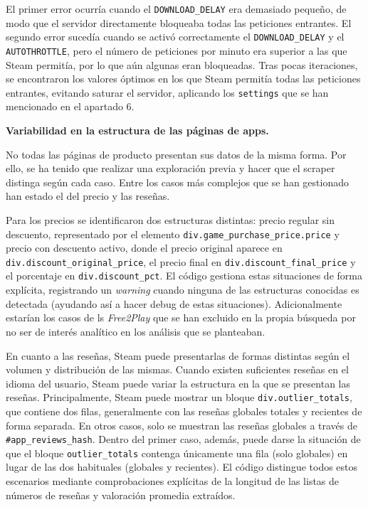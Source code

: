 \documentclass[
]{article}
\begin{document}
El primer error ocurría cuando el \texttt{DOWNLOAD\_DELAY} era demasiado pequeño, de modo que el servidor directamente bloqueaba todas las peticiones entrantes. El segundo error sucedía cuando se activó correctamente el \texttt{DOWNLOAD\_DELAY} y el \texttt{AUTOTHROTTLE}, pero el número de peticiones por minuto era superior a las que Steam permitía, por lo que aún algunas eran bloqueadas. Tras pocas iteraciones, se encontraron los valores óptimos en los que Steam permitía todas las peticiones entrantes, evitando saturar el servidor, aplicando los \texttt{settings} que se han mencionado en el apartado 6.

\vspace{0.2cm}
\textbf{Variabilidad en la estructura de las páginas de apps.}

No todas las páginas de producto presentan sus datos de la misma forma. Por ello, se ha tenido que realizar una exploración previa y hacer que el scraper distinga según cada caso. Entre los casos más complejos que se han gestionado han estado el del precio y las reseñas. 

Para los precios se identificaron dos estructuras distintas: precio regular sin descuento, representado por el elemento \texttt{div.game\_purchase\_price.price} y precio con descuento activo, donde el precio original aparece en \texttt{div.discount\_original\_price}, el precio final en \texttt{div.discount\_final\_price} y el porcentaje en \texttt{div.discount\_pct}. El código gestiona estas situaciones de forma explícita, registrando un \textit{warning} cuando ninguna de las estructuras conocidas es detectada (ayudando así a hacer debug de estas situaciones). Adicionalmente estarían los casos de ls \textit{Free2Play} que se han excluido en la propia búsqueda por no ser de interés analítico en los análisis que se planteaban. 

En cuanto a las reseñas, Steam puede presentarlas de formas distintas según el volumen y distribución de las mismas. Cuando existen suficientes reseñas en el idioma del usuario, Steam puede variar la estructura en la que se presentan las reseñas. Principalmente, Steam puede mostrar un bloque \texttt{div.outlier\_totals}, que contiene dos filas, generalmente con las reseñas globales totales y recientes de forma separada. En otros casos, solo se muestran las reseñas globales a través de \texttt{\#app\_reviews\_hash}. Dentro del primer caso, además, puede darse la situación de que el bloque \texttt{outlier\_totals} contenga únicamente una fila (solo globales) en lugar de las dos habituales (globales y recientes). El código distingue todos estos escenarios mediante comprobaciones explícitas de la longitud de las listas de números de reseñas y valoración promedia extraídos.
\end{document}
